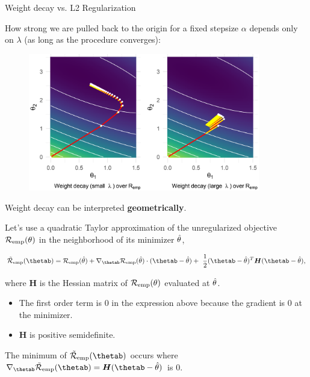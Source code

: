 \begin{vbframe}{Weight decay vs. L2 Regularization}
\framebreak

How strong we are pulled back to the origin for a fixed stepsize $\alpha$ depends only on $\lambda$ (as long as the procedure converges):

\begin{figure}
\includegraphics[width=0.9\textwidth]{figure_man/L2-regularization02.png}\\
\end{figure}


\framebreak

Weight decay can be interpreted \textbf{geometrically}. 

\lz 

Let's use a quadratic Taylor approximation of the unregularized objective $\mathcal{R}_{\text{emp}}(\theta)$ in the neighborhood of its minimizer $\hat{\theta}$,  

$$ \mathcal{\tilde R}_{\text{emp}}(\thetab)= \mathcal{R}_{\text{emp}}(\thetah) + \nabla_{\thetab} \mathcal{R}_{\text{emp}}(\thetah)\cdot(\thetab - \thetah) + \ \frac{1}{2} (\thetab - \thetah)^T \bm{H} (\thetab - \thetah), $$

where $\bm{H}$ is the Hessian matrix of $\mathcal{R}_{\text{emp}}(\theta)$ evaluated at $\hat{\theta}$. 

\lz

\begin{itemize}
  \item The first order term is 0 in the expression above because the gradient is $0$ at the minimizer.
  \item $\bm{H}$ is positive semidefinite.
\end{itemize}

\lz

\framebreak

\normalsize

The minimum of $\mathcal{\tilde R}_{\text{emp}}(\thetab)$ occurs where $\nabla_{\thetab}\mathcal{\tilde R}_{\text{emp}}(\thetab) = \bm{H}(\thetab - \thetah)$ is $0$.


\end{vbframe}

